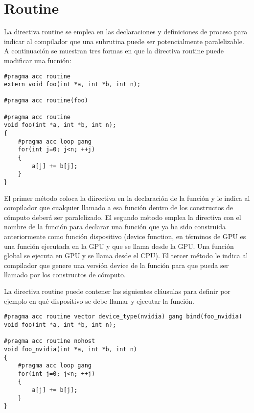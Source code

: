 \section{Routine}
La directiva routine se emplea en las declaraciones y definiciones de proceso para indicar al compilador que una subrutina puede ser potencialmente paralelizable. A continuación se muestran tres formas en que la directiva routine puede modificar una fucnión:

\begin{lstlisting}[style=CStyle]
#pragma acc routine
extern void foo(int *a, int *b, int n);

#pragma acc routine(foo)

#pragma acc routine
void foo(int *a, int *b, int n);
{
    #pragma acc loop gang
    for(int j=0; j<n; ++j)
    {
        a[j] += b[j];
    }
}
\end{lstlisting}

El primer método coloca la diirectiva en la declaración de la función y le indica al compilador que cualquier llamado a esa función dentro de los constructos de cómputo deberá ser paralelizado. El segundo método emplea la directiva con el nombre de la función para declarar una función que ya ha sido construida anteriormente como función dispositivo (device function, en términos de GPU es una función ejecutada en la GPU y que se llama desde la GPU. Una función global se ejecuta en GPU y se llama desde el CPU). El tercer método le indica al compilador que genere una versión device de la función para que pueda ser llamado por los constructos de cómputo.

La directiva routine puede contener las siguientes cláusulas para definir por ejemplo en qué dispositivo se debe llamar y ejecutar la función.

\begin{lstlisting}[style=CStyle]
#pragma acc routine vector device_type(nvidia) gang bind(foo_nvidia)
void foo(int *a, int *b, int n);

#pragma acc routine nohost
void foo_nvidia(int *a, int *b, int n)
{
    #pragma acc loop gang
    for(int j=0; j<n; ++j)
    {
        a[j] += b[j];
    }
}
\end{lstlisting}

\clearpage